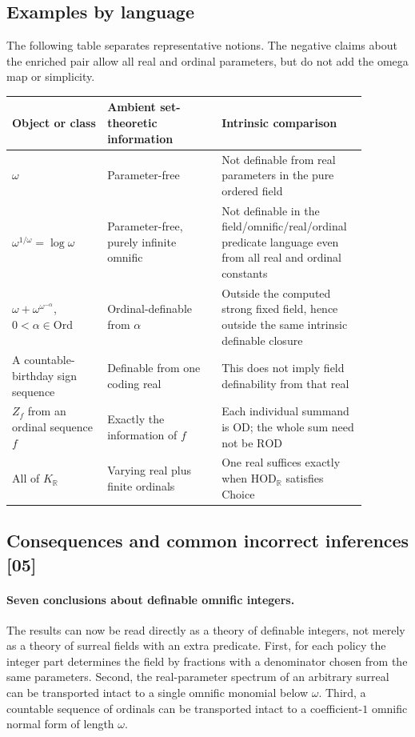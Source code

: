 \documentclass[11pt,a4paper]{article}
\numberwithin{equation}{section}
\theoremstyle{definition}
\theoremstyle{remark}
\newcommand{\Ord}{\mathrm{Ord}}
\newcommand{\HOD}{\mathrm{HOD}}
\newcommand{\R}{\mathbb R}
\newcommand{\src}[1]{\textup{\textsf{\small[#1]}}}
\newcommand{\ROD}{\mathrm{ROD}}
\newcommand{\HR}{\HOD_{\R}}
\newcommand{\KR}{K_{\R}}
\begin{document}
\subsection{Examples by language}

The following table separates representative notions. The negative
claims about the enriched pair allow all real and ordinal parameters,
but do not add the omega map or simplicity.

\begin{center}
\small
\begin{tabular}{>{\raggedright\arraybackslash}p{0.25\linewidth}>{\raggedright\arraybackslash}p{0.30\linewidth}>{\raggedright\arraybackslash}p{0.33\linewidth}}
\toprule
Object or class & Ambient set-theoretic information & Intrinsic comparison\\
\midrule
$\omega$ & Parameter-free & Not definable from real parameters in the pure ordered field\\
$\omega^{1/\omega}=\log\omega$ & Parameter-free, purely infinite omnific & Not definable in the field/omnific/real/ordinal predicate language even from all real and ordinal constants\\
$\omega+\omega^{\omega^{-\alpha}}$, $0<\alpha\in\Ord$ & Ordinal-definable from $\alpha$ & Outside the computed strong fixed field, hence outside the same intrinsic definable closure\\
A countable-birthday sign sequence & Definable from one coding real & This does not imply field definability from that real\\
$Z_f$ from an ordinal sequence $f$ & Exactly the information of $f$ & Each individual summand is OD; the whole sum need not be $\ROD$\\
All of $\KR$ & Varying real plus finite ordinals & One real suffices exactly when $\HR$ satisfies Choice\\
\bottomrule
\end{tabular}
\end{center}


\subsection{Consequences and common incorrect inferences \src{05}}
\label{dsn:ca:sec:consequences}

\paragraph{Seven conclusions about definable omnific integers.}
The results can now be read directly as a theory of definable integers,
not merely as a theory of surreal fields with an extra predicate.
First, for each policy the integer part determines the field by
fractions with a denominator chosen from the same parameters.
Second, the real-parameter spectrum of an arbitrary surreal can be
transported intact to a single omnific monomial below $\omega$.
Third, a countable sequence of ordinals can be transported intact to
a coefficient-$1$ omnific normal form of length $\omega$.
\end{document}
